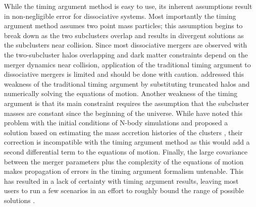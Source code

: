 While the timing argument method is easy to use, its inherent assumptions result in non-negligible error for dissociative systems.
Most importantly the timing argument method assumes two point mass particles; this assumption begins to break down as the two subclusters overlap and results in divergent solutions as the subclusters near collision.
Since most dissociative mergers are observed with the two-subcluster halos overlapping and dark matter constraints depend on the merger dynamics near collision, application of the traditional timing argument to dissociative mergers is limited and should be done with caution.
\citet{Nusser:2008iw} addressed this weakness of the traditional timing argument by substituting truncated \citet*[][hereafter NFW]{Navarro:1996ce} halos and numerically solving the equations of motion.
Another weakness of the timing argument is that its main constraint requires the  assumption that the subcluster masses are constant since the beginning of the universe.  
While \citet{Angus:2007em} have noted this problem with the initial conditions of N-body simulations and proposed a solution based on estimating the mass accretion histories of the clusters \citep[e.g.][]{Wechsler:2002kh}, their correction is incompatible with the timing argument method as this would add a second differential term to the equations of motion.
Finally, the large covariance between the merger parameters plus the complexity of the equations of motion makes propagation of errors in the timing argument formalism untenable.
This has resulted in a lack of certainty with timing argument results, leaving most users to run a few scenarios in an effort to roughly bound the range of possible solutions \citep[e.g.][]{Boschin:2012he}.  

